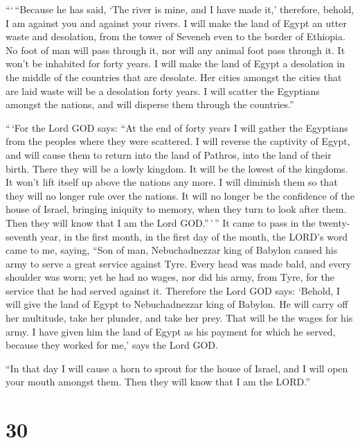 ```\,``Because he has said, `The river is mine, and I have made it,'
 therefore, behold, I am against you and against your
rivers. I will make the land of Egypt an utter waste and desolation,
from the tower of Seveneh even to the border of Ethiopia. 
No foot of man will pass through it, nor will any animal foot pass
through it. It won't be inhabited for forty years.  I will
make the land of Egypt a desolation in the middle of the countries that
are desolate. Her cities amongst the cities that are laid waste will be
a desolation forty years. I will scatter the Egyptians amongst the
nations, and will disperse them through the countries.''

 ``\,`For the Lord GOD says: ``At the end of forty years I
will gather the Egyptians from the peoples where they were scattered.
 I will reverse the captivity of Egypt, and will cause them
to return into the land of Pathros, into the land of their birth. There
they will be a lowly kingdom.  It will be the lowest of the
kingdoms. It won't lift itself up above the nations any more. I will
diminish them so that they will no longer rule over the nations.
 It will no longer be the confidence of the house of
Israel, bringing iniquity to memory, when they turn to look after them.
Then they will know that I am the Lord GOD.''\,'\,''  It
came to pass in the twenty-seventh year, in the first month, in the
first day of the month, the LORD's word came to me, saying,
 ``Son of man, Nebuchadnezzar king of Babylon caused his
army to serve a great service against Tyre. Every head was made bald,
and every shoulder was worn; yet he had no wages, nor did his army, from
Tyre, for the service that he had served against it. 
Therefore the Lord GOD says: `Behold, I will give the land of Egypt to
Nebuchadnezzar king of Babylon. He will carry off her multitude, take
her plunder, and take her prey. That will be the wages for his army.
 I have given him the land of Egypt as his payment for
which he served, because they worked for me,' says the Lord GOD.

 ``In that day I will cause a horn to sprout for the house
of Israel, and I will open your mouth amongst them. Then they will know
that I am the LORD.''

\hypertarget{section-28}{%
\section{30}\label{section-28}}

